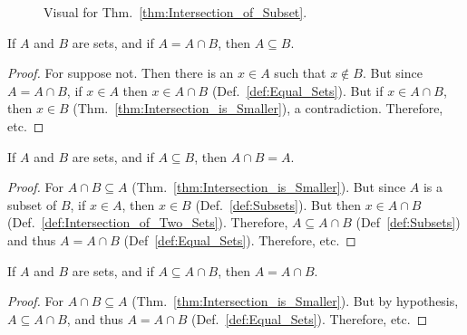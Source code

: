         \begin{figure}[H]
            \centering
            \captionsetup{type=figure}
            \centering
            
            \caption{Visual for Thm.~\ref{thm:Intersection_of_Subset}.}
            \label{fig:Union_Intersection_venn_diagram}
        \end{figure}
        \begin{theorem}
            \label{thm:Intersection_is_Equal}%
            If $A$ and $B$ are sets, and if
            $A=A\cap{B}$, then $A\subseteq{B}$.
        \end{theorem}
        \begin{proof}
            For suppose not. Then there is an $x\in{A}$ such
            that $x\notin{B}$. But since $A=A\cap{B}$,
            if $x\in{A}$ then $x\in{A}\cap{B}$
            (Def.~\ref{def:Equal_Sets}). But if
            $x\in{A}\cap{B}$, then $x\in{B}$
            (Thm.~\ref{thm:Intersection_is_Smaller}),
            a contradiction. Therefore, etc.
        \end{proof}
        \begin{theorem}
            \label{thm:Intersection_of_Subset}%
            If $A$ and $B$ are sets, and if
            $A\subseteq{B}$, then $A\cap{B}=A$.
        \end{theorem}
        \begin{proof}
            For $A\cap{B}\subseteq{A}$
            (Thm.~\ref{thm:Intersection_is_Smaller}). But
            since $A$ is a subset of $B$, if $x\in{A}$, then
            $x\in{B}$ (Def.~\ref{def:Subsets}). But then
            $x\in{A}\cap{B}$
            (Def.~\ref{def:Intersection_of_Two_Sets}). Therefore,
            $A\subseteq{A}\cap{B}$ (Def~\ref{def:Subsets})
            and thus $A=A\cap{B}$ (Def~\ref{def:Equal_Sets}).
            Therefore, etc.
        \end{proof}
        \begin{theorem}
            \label{thm:Conv_Intersection_is_Smaller}%
            If $A$ and $B$ are sets, and if
            $A\subseteq{A}\cap{B}$, then $A=A\cap{B}$.
        \end{theorem}
        \begin{proof}
            For $A\cap{B}\subseteq{A}$
            (Thm.~\ref{thm:Intersection_is_Smaller}). But
            by hypothesis, $A\subseteq{A}\cap{B}$, and thus
            $A=A\cap{B}$ (Def.~\ref{def:Equal_Sets}).
            Therefore, etc.
        \end{proof}
